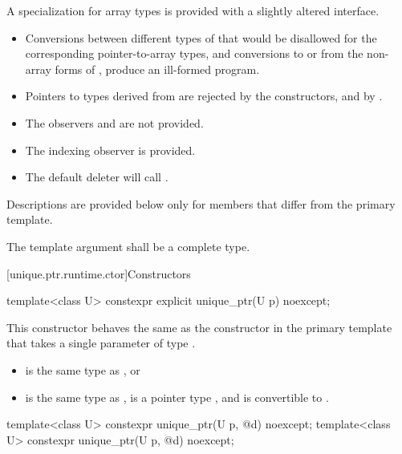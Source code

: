 \pnum
A specialization for array types is provided with a slightly altered
interface.

\begin{itemize}
\item Conversions between different types of
that would be disallowed for the corresponding pointer-to-array types,
and conversions to or from the non-array forms of
, produce an ill-formed program.

\item Pointers to types derived from  are
rejected by the constructors, and by .

\item The observers  and
 are not provided.

\item The indexing observer  is provided.

\item The default deleter will call .
\end{itemize}

\pnum
Descriptions are provided below only for members that
differ from the primary template.

\pnum
The template argument  shall be a complete type.

[unique.ptr.runtime.ctor]{Constructors}

%
\begin{itemdecl}
template<class U> constexpr explicit unique_ptr(U p) noexcept;
\end{itemdecl}

\begin{itemdescr}
\pnum
This constructor behaves the same as
the constructor in the primary template that
takes a single parameter of type .

\pnum
\constraints
\begin{itemize}
\item {} is the same type as , or
\item {} is the same type as ,
 is a pointer type , and
 is convertible to .
\end{itemize}
\end{itemdescr}

%
\begin{itemdecl}
template<class U> constexpr unique_ptr(U p, @\seebelow@ d) noexcept;
template<class U> constexpr unique_ptr(U p, @\seebelow@ d) noexcept;
\end{itemdecl}

